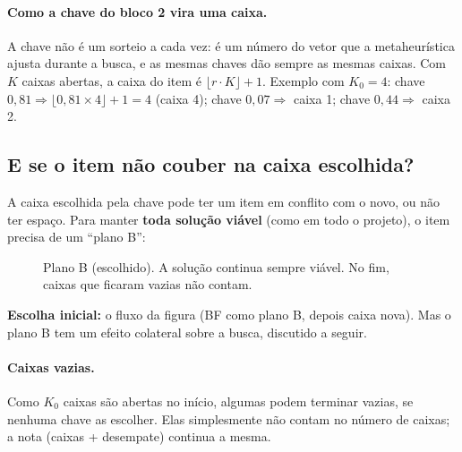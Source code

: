 \documentclass[11pt,a4paper]{article}
\begin{document}
\paragraph{Como a chave do bloco 2 vira uma caixa.} A chave não é um sorteio a cada vez: é um número do vetor que a
metaheurística ajusta durante a busca, e as mesmas chaves dão sempre as mesmas caixas. Com $K$ caixas abertas, a caixa do item é
$\lfloor r\cdot K\rfloor+1$. Exemplo com $K_0=4$: chave $0{,}81 \Rightarrow \lfloor 0{,}81\times4\rfloor+1 = 4$
(caixa 4); chave $0{,}07 \Rightarrow$ caixa 1; chave $0{,}44 \Rightarrow$ caixa 2.

\subsection{E se o item não couber na caixa escolhida?}\label{sec:naocabe}
A caixa escolhida pela chave pode ter um item em conflito com o novo, ou não ter espaço. Para
manter \textbf{toda solução viável} (como em todo o projeto), o item precisa de um ``plano B'':

\begin{figure}[H]
\centering
{}
\caption{Plano B (escolhido). A solução continua sempre viável. No fim, caixas que ficaram vazias não contam.}\label{fig:planob}
\end{figure}

\noindent \textbf{Escolha inicial:} o fluxo da figura (BF como plano B, depois caixa nova). Mas o plano B tem um efeito
colateral sobre a busca, discutido a seguir.

\paragraph{Caixas vazias.} Como $K_0$ caixas são abertas no início, algumas podem terminar vazias, se nenhuma chave as
escolher. Elas simplesmente não contam no número de caixas; a nota (caixas + desempate) continua a mesma.
\end{document}
